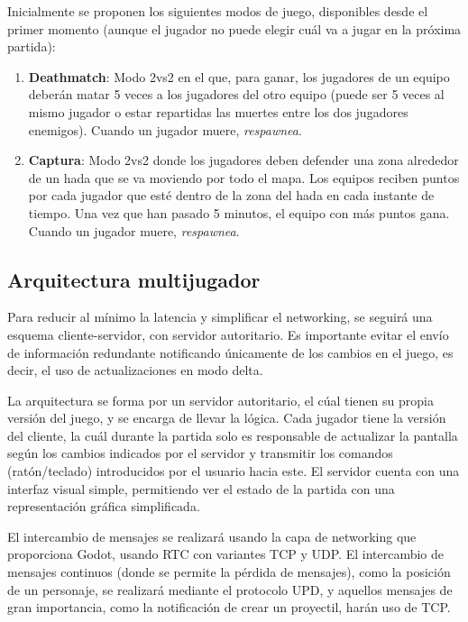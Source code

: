 Inicialmente se proponen los siguientes modos de juego, disponibles desde el primer momento (aunque el jugador no puede elegir cuál va a jugar en la próxima partida):
\begin{enumerate}
	\item \textbf{Deathmatch}: Modo 2vs2 en el que, para ganar, los jugadores de un equipo deberán matar 5 veces a los jugadores del otro equipo (puede ser 5 veces al mismo jugador o estar repartidas las muertes entre los dos jugadores enemigos). Cuando un jugador muere, \emph{respawnea}.
	
	\item \textbf{Captura}: Modo 2vs2 donde los jugadores deben defender una zona alrededor de un hada que se va moviendo por todo el mapa. Los equipos reciben puntos por cada jugador que esté dentro de la zona del hada en cada instante de tiempo. Una vez que han pasado 5 minutos, el equipo con más puntos gana. Cuando un jugador muere, \emph{respawnea}.
	
\end{enumerate}

\subsection{Arquitectura multijugador}
Para reducir al mínimo la latencia y simplificar el networking, se seguirá una esquema cliente-servidor, con servidor autoritario. Es importante evitar el envío de información redundante notificando únicamente de los cambios en el juego, es decir, el uso de actualizaciones en modo delta.

\vspace{\baselineskip}

La arquitectura se forma por un servidor autoritario, el cúal tienen su propia versión del juego, y se encarga de llevar la lógica. Cada jugador tiene la versión del cliente, la cuál durante la partida solo es responsable de actualizar la pantalla según los cambios indicados por el servidor y transmitir los comandos (ratón/teclado) introducidos por el usuario hacia este.
El servidor cuenta con una interfaz visual simple, permitiendo ver el estado de la partida con una representación gráfica simplificada.

El intercambio de mensajes se realizará usando la capa de networking que proporciona Godot, usando RTC con variantes TCP y UDP. El intercambio de mensajes continuos (donde se permite la pérdida de mensajes), como la posición de un personaje, se realizará mediante el protocolo UPD, y aquellos mensajes de gran importancia, como la notificación de crear un proyectil, harán uso de TCP.

